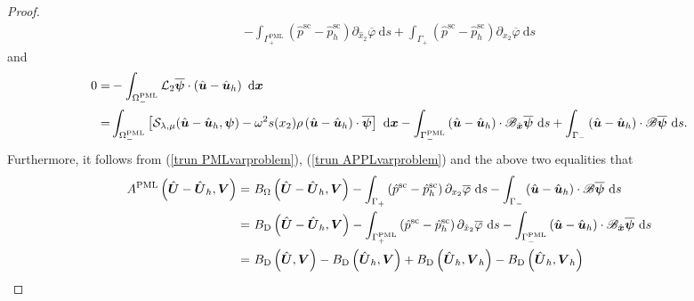 \documentclass[final,3p,times]{elsarticle}
\begin{document}
\begin{proof}
\begin{align*}
		- \int_{\Gamma_+^\mathrm{PML}}\left(\hat{p}^{\mathrm{sc}}-\hat{p}^{\mathrm{sc}}_h\right) \partial_{\hat{x}_2} \overline{\varphi} \mathrm{~d} s
		+ \int_{\Gamma_+}\left(\hat{p}^{\mathrm{sc}}-\hat{p}^{\mathrm{sc}}_h\right) \partial_{x_2} \overline{\varphi} \mathrm{~d} s
	\end{align*}
	and 
	\begin{align*}
		0=&-\int_{\Omega^{\mathrm{PML}}_-}\mathcal{L}_2\overline{\boldsymbol{\psi}}\cdot\left(\hat{\boldsymbol{u}}-\hat{\boldsymbol{u}}_h\right)   \mathrm{~d} \boldsymbol{x} \notag\\
		= &\int_{\Omega^{\mathrm{PML}}_-}\left[\mathcal{S}_{\lambda, \mu}(\hat{\boldsymbol{u}}-\hat{\boldsymbol{u}}_h, \boldsymbol{\psi}) - \omega^2 s(x_2) \rho \left(\hat{\boldsymbol{u}}-\hat{\boldsymbol{u}}_h\right) \cdot \overline{\boldsymbol{\psi}}\right] \mathrm{~d} \boldsymbol{x}
		- \int_{\Gamma_-^\mathrm{PML}} \left(\hat{\boldsymbol{u}}-\hat{\boldsymbol{u}}_h\right) \cdot \mathscr{B}_{\hat{\boldsymbol{x}}} \overline{\boldsymbol{\psi}} \mathrm{~d} s
		+ \int_{\Gamma_-} \left(\hat{\boldsymbol{u}}-\hat{\boldsymbol{u}}_h\right) \cdot \mathscr{B} \overline{\boldsymbol{\psi}} \mathrm{~d} s.
	\end{align*}
	Furthermore, it follows from (\ref{trun PMLvarproblem}), (\ref{trun APPLvarproblem}) and the above two equalities that
	\begin{align}\label{4.2.2}
		A^{\mathrm{PML}}\left(\hat{\boldsymbol{U}}-\hat{\boldsymbol{U}}_h,\boldsymbol{V}\right)
		=&~ B_{\Omega}\left(\hat{\boldsymbol{U}}-\hat{\boldsymbol{U}}_h, \boldsymbol{V}\right) - \int_{\Gamma_+}\left(\hat{p}^{\mathrm{sc}}-\hat{p}^{\mathrm{sc}}_h\right) \partial_{x_2} \overline{\varphi} \mathrm{~d} s
		- \int_{\Gamma_-} \left(\hat{\boldsymbol{u}}-\hat{\boldsymbol{u}}_h\right) \cdot \mathscr{B} \overline{\boldsymbol{\psi}} \mathrm{~d} s \notag\\
		=&~B_\mathrm{D}\left(\hat{\boldsymbol{U}}-\hat{\boldsymbol{U}}_h, \boldsymbol{V}\right)
		- \int_{\Gamma_+^\mathrm{PML}}\left(\hat{p}^{\mathrm{sc}}-\hat{p}^{\mathrm{sc}}_h\right) \partial_{\hat{x}_2} \overline{\varphi} \mathrm{~d} s
		- \int_{\Gamma_-^\mathrm{PML}} \left(\hat{\boldsymbol{u}}-\hat{\boldsymbol{u}}_h\right) \cdot \mathscr{B}_{\hat{\boldsymbol{x}}} \overline{\boldsymbol{\psi}} \mathrm{~d} s\notag\\
		=&~ B_\mathrm{D}\left(\hat{\boldsymbol{U}}, \boldsymbol{V}\right) -B_\mathrm{D}\left(\hat{\boldsymbol{U}}_h, \boldsymbol{V}\right)
		+ B_\mathrm{D}\left(\hat{\boldsymbol{U}}_h, \boldsymbol{V}_h\right)
		- B_\mathrm{D}\left(\hat{\boldsymbol{U}}_h, \boldsymbol{V}_h\right)

\end{align}
\end{proof}
\end{document}
